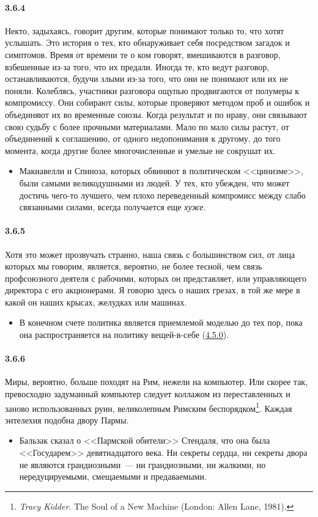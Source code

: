 \paragraph{3.6.4}\hypertarget{par:3.6.4}{} Некто, задыхаясь, говорит другим, которые понимают только то, что хотят услышать. Это история о тех, кто обнаруживает себя посредством загадок и симптомов. Время от времени те о ком говорят, вмешиваются в разговор, взбешенные из-за того, что
их предали. Иногда те, кто ведут разговор, останавливаются, будучи злыми из-за того, что они не понимают или их не поняли. Колеблясь, участники разговора ощупью продвигаются от полумеры к компромиссу. Они собирают силы, которые проверяют методом проб и ошибок и объединяют их во временные союзы. Когда результат и по нраву, они связывают свою судьбу с более прочными материалами. Мало по мало силы
растут, от объединений к соглашению, от одного недопонимания к другому, до того момента, когда другие более многочисленные и умелые не сокрушат их.
	\begin{itemize}
	\item 
	Макиавелли и Спиноза, которых обвиняют в политическом <<цинизме>>, были самыми великодушными из людей. У тех, кто убежден, что может достичь чего-то лучшего, чем плохо переведенный компромисс между слабо связанными силами, всегда получается еще {\itshape хуже}.
	\end{itemize}

\paragraph{3.6.5}\hypertarget{par:3.6.5}{} Хотя это может прозвучать странно, наша связь с большинством сил, от лица которых мы говорим, является, вероятно, не более тесной, чем связь профсоюзного деятеля с рабочими, которых он представляет, или управляющего директора с его акционерами. Я говорю здесь о наших грезах, в той же мере в какой он наших крысах,
желудках или машинах. 
	\begin{itemize}
	\item 
	В конечном счете политика является приемлемой моделью до тех пор, пока она распространяется на политику вещей-в-себе (\hyperlink{par:4.5.0}{4.5.0}).
	\end{itemize}

\paragraph{3.6.6}\hypertarget{par:3.6.6}{} Миры, вероятно, больше походят на Рим, нежели на компьютер. Или скорее так, превосходно задуманный компьютер следует коллажом из переставленных и заново использованных руин, великолепным Римским беспорядком\footnote{{\itshape Tracy Kidder}. The Soul of a New Machine (London: Allen Lane, 1981).}. Каждая энтелехия подобна двору Пармы.
	\begin{itemize}
	\item 
	Бальзак сказал о <<Пармской обители>> Стендаля, что она была <<Государем>> девятнадцатого века. Ни секреты сердца, ни секреты двора не являются грандиозными~--- ни грандиозными, ни жалкими, но нередуцируемыми, смещаемыми и предаваемыми.	
	\end{itemize}	